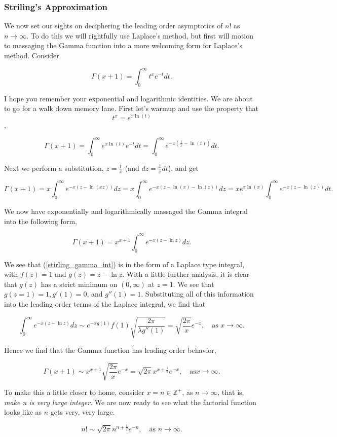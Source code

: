  
%
\subsubsection{Striling's Approximation}
 
 We now set our sights on deciphering the leading order asymptotics of $n!$ as $n\rightarrow\infty$. To do this we will rightfully use Laplace's method, but first will motion to massaging the Gamma function into a more welcoming form for Laplace's method. Consider
 
$$\Gamma\left( x+1 \right) = \int_0^\infty t^x e^{-t} dt.$$

I hope you remember your exponential and logarithmic identities. We are about to go for a walk down memory lane. First let's warmup and use the property that $$t^x = e^{ x\ln(t) }$$,

$$\Gamma\left( x+1 \right) = \int_0^\infty e^{ x\ln(t) } e^{-t} dt = \int_0^{\infty} e^{-x \left( \frac{t}{x} - \ln(t)  \right) } dt.$$

Next we perform a substitution, $z = \frac{t}{x}$ (and $dz = \frac{1}{x} dt$), and get

$$\Gamma\left( x+1 \right) = x \int_0^\infty e^{-x \left(  z-\ln(xz) \right) } dz = x \int_0^\infty e^{-x \left(  z-\ln(x)-\ln(z) \right) } dz = xe^{x\ln(x)} \int_0^\infty e^{-x\left(  z-\ln(z)  \right) } dt.$$

We now have exponentially and logarithmically massaged the Gamma integral into the following form,

\begin{equation}
\label{stirling_gamma_int} \Gamma\left( x+1 \right) = x^{x+1} \int_0^\infty e^{-x \left( z - \ln z \right) } dz.
\end{equation}

We see that (\ref{stirling_gamma_int}) is in the form of a Laplace type integral, with $f(z)=1$ and $g(z) = z - \ln z$. With a  little further analysis, it is clear that $g(z)$ has a strict minimum on $(0,\infty)$ at $z=1$. We see that $g(z=1)=1, g'(1)=0$, and $g''(1)=1.$ Substituting all of this information into the leading order terms of the Laplace integral, we find that 

$$\int_0^\infty e^{-x\left(  z - \ln z \right) } dz \sim e^{-x g(1) } f(1) \sqrt{ \frac{2\pi}{\lambda g''(1) } }  = \sqrt{ \frac{2\pi}{x} } e^{-x}, \ \ \ \mbox{ as } x\rightarrow\infty.$$

Hence we find that the Gamma function has leading order behavior,

$$\Gamma(x+1) \sim x^{x+1} \sqrt{ \frac{2\pi}{x} } e^{-x} = \sqrt{2\pi} x^{ x+\frac{1}{2} } e^{-x}, \ \ \ \mbox{ as} x\rightarrow\infty.$$

To make this a little closer to home, consider $x=n\in\mathbb{Z}^+$, as $n\rightarrow\infty$, that is,  \emph{make n is very large integer}. We are now ready to see what the factorial function looks like as $n$ gets very, very large. 

$$n! \sim \sqrt{2\pi} n^{n+\frac{1}{2}} e^{-n}, \  \ \ \mbox{ as } n\rightarrow\infty.$$
 